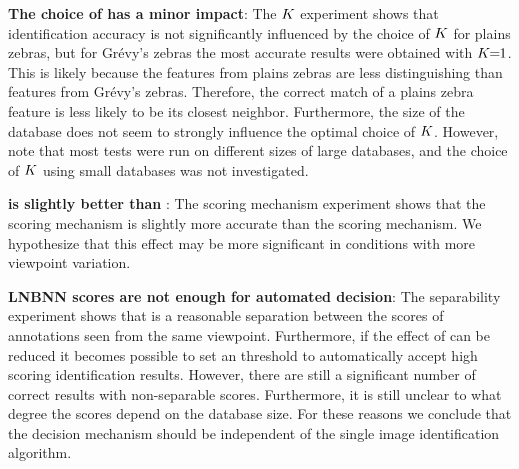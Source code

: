 \begin{itemln}
              \item \textbf{The choice of \K{} has a minor impact}: 
                The $K$ experiment shows that identification accuracy is not significantly influenced by the
                  choice of $K$ for plains zebras, but for Grévy's zebras the most accurate results were obtained
                  with $K\mkern-6mu=\mkern-6mu1$.
                This is likely because the features from plains zebras are less distinguishing than features from
                  Grévy's zebras.
                Therefore, the correct match of a plains zebra feature is less likely to be its closest neighbor.
                Furthermore, the size of the database does not seem to strongly influence the optimal choice of
                  $K$.
                However, note that most tests were run on different sizes of large databases, and the choice of
                  $K$ using small databases was not investigated.

              \item \textbf{\Nsumprefix{} is slightly better than \csumprefix{} \namescoring{}}:
                The scoring mechanism experiment shows that the \nsumprefix{} scoring mechanism is slightly more
                  accurate than the \csumprefix{} scoring mechanism.
                We hypothesize that this effect may be more significant in conditions with more viewpoint
                  variation.

              \item \textbf{LNBNN scores are not enough for automated decision}:
                The separability experiment shows that is a reasonable separation between the scores of
                  annotations seen from the same viewpoint.
                Furthermore, if the effect of \photobombings{} can be reduced it becomes possible to set an
                  threshold to automatically accept high scoring identification results.
                However, there are still a significant number of correct results with non-separable scores.
                Furthermore, it is still unclear to what degree the scores depend on the database size.
                For these reasons we conclude that the decision mechanism should be independent of the single
                  image identification algorithm.
        \end{itemln}
